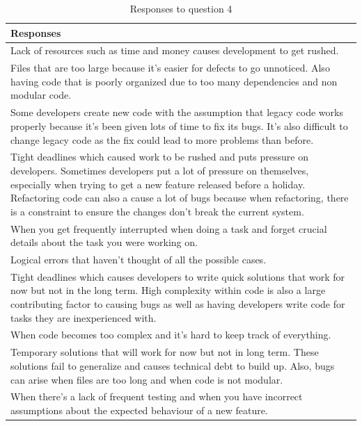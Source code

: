 \documentclass[../main.tex]{subfiles}
\begin{document}
\begin{table}[H]
\centering
    \begin{tabular}{|p{15cm}|}
        \hline
        \textbf{Responses}\\ 
        \hline\hline
        Lack of resources such as time and money causes development to get rushed.\\
        \hline
        Files that are too large because it's easier for defects to go unnoticed. Also having code that is poorly organized due to too many dependencies and non modular code.\\
        \hline
        Some developers create new code with the assumption that legacy code works properly because it's been given lots of time to fix its bugs. It's also difficult to change legacy code as the fix could lead to more problems than before.\\
        \hline
        Tight deadlines which caused work to be rushed and puts pressure on developers. Sometimes developers put a lot of pressure on themselves, especially when trying to get a new feature released before a holiday. Refactoring code can also a cause a lot of bugs because when refactoring, there is a constraint to ensure the changes don't break the current system.\\
        \hline
        When you get frequently interrupted when doing a task and forget crucial details about the task you were working on.\\
        \hline
        Logical errors that haven't thought of all the possible cases.\\
        \hline
        Tight deadlines which causes developers to write quick solutions that work for now but not in the long term. High complexity within code is also a large contributing factor to causing bugs as well as having developers write code for tasks they are inexperienced with.\\
        \hline
        When code becomes too complex and it's hard to keep track of everything.\\
        \hline
        Temporary solutions that will work for now but not in long term. These solutions fail to generalize and causes technical debt to build up. Also, bugs can arise when files are too long and when code is not modular.\\
        \hline
        When there's a lack of frequent testing and when you have incorrect assumptions about the expected behaviour of a new feature.\\
        \hline
    \end{tabular}
\caption{Responses to question 4}
\label{table:rq2Table4}
\end{table}
\end{document}
